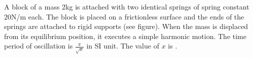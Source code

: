\item A block of a mass 2kg is attached with two identical springs of spring constant 20N/m each. The block is placed on a frictionless surface and the ends of the springs are attached to rigid supports (see figure). When the mass is displaced from its equilibrium position, it executes a simple harmonic motion. The time period of oscillation is \(\frac{\pi}{\sqrt{x}}\) in SI unit. The value of \( x \) is \underline{\hspace{2.5cm}}.
    \begin{center}
    \end{center}